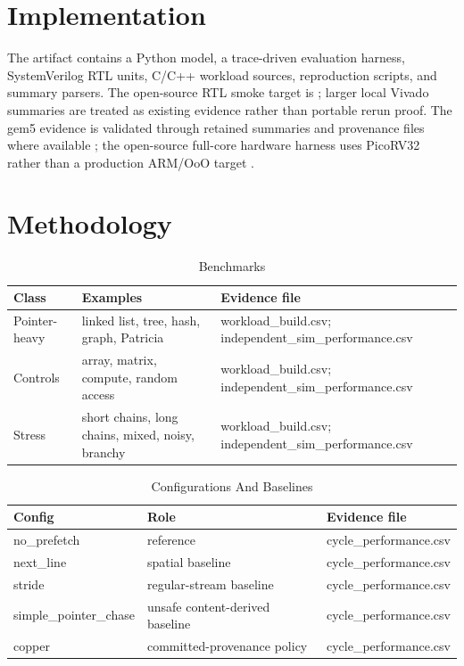 \documentclass[10pt]{article}
\begin{document}
\section{Implementation}
The artifact contains a Python model, a trace-driven evaluation harness, SystemVerilog RTL units, C/C++ workload sources, reproduction scripts, and summary parsers. The open-source RTL smoke target is ; larger local Vivado summaries are treated as existing evidence rather than portable rerun proof. The gem5 evidence is validated through retained summaries and provenance files where available \cite{binkert2011gem5}; the open-source full-core hardware harness uses PicoRV32 rather than a production ARM/OoO target \cite{wolf2019picorv32}.

\section{Methodology}
\begin{table}[H]
\centering
\caption{Benchmarks}
\begin{tabularx}{\linewidth}{lYY}
\hline
Class & Examples & Evidence file \\
\hline
Pointer-heavy & linked list, tree, hash, graph, Patricia & workload\_build.csv; independent\_sim\_performance.csv \\
Controls & array, matrix, compute, random access & workload\_build.csv; independent\_sim\_performance.csv \\
Stress & short chains, long chains, mixed, noisy, branchy & workload\_build.csv; independent\_sim\_performance.csv \\
\hline
\end{tabularx}
\end{table}

\begin{table}[H]
\centering
\caption{Configurations And Baselines}
\begin{tabularx}{\linewidth}{lYY}
\hline
Config & Role & Evidence file \\
\hline
no\_prefetch & reference & cycle\_performance.csv \\
next\_line & spatial baseline & cycle\_performance.csv \\
stride & regular-stream baseline & cycle\_performance.csv \\
simple\_pointer\_chase & unsafe content-derived baseline & cycle\_performance.csv \\
copper & committed-provenance policy & cycle\_performance.csv \\
\hline
\end{tabularx}
\end{table}
\end{document}
